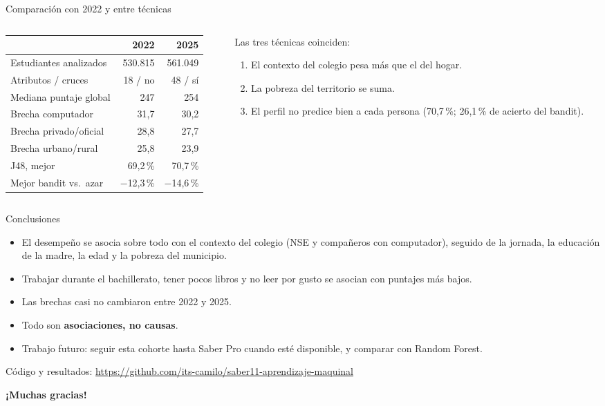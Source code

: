 \documentclass[aspectratio=169,11pt]{beamer}
\begin{document}
\begin{frame}{Comparación con 2022 y entre técnicas}
  \begin{columns}
    \begin{column}{0.55\textwidth}
      \small
      \begin{tabular}{lrr}
        \toprule
        & 2022 & 2025 \\
        \midrule
        Estudiantes analizados & 530.815 & 561.049 \\
        Atributos / cruces & 18 / no & 48 / sí \\
        Mediana puntaje global & 247 & 254 \\
        Brecha computador & 31,7 & 30,2 \\
        Brecha privado/oficial & 28,8 & 27,7 \\
        Brecha urbano/rural & 25,8 & 23,9 \\
        J48, mejor & 69,2\,\% & 70,7\,\% \\
        Mejor bandit vs.\ azar & $-$12,3\,\% & $-$14,6\,\% \\
        \bottomrule
      \end{tabular}
    \end{column}
    \begin{column}{0.45\textwidth}
      Las tres técnicas coinciden:
      \begin{enumerate}
        \item El contexto del colegio pesa más que el del hogar.
        \item La pobreza del territorio se suma.
        \item El perfil no predice bien a cada persona
        (70,7\,\%; 26,1\,\% de acierto del bandit).
      \end{enumerate}
    \end{column}
  \end{columns}
\end{frame}

\begin{frame}{Conclusiones}
  \begin{itemize}
    \item El desempeño se asocia sobre todo con el contexto del colegio
    (NSE y compañeros con computador), seguido de la jornada, la educación
    de la madre, la edad y la pobreza del municipio.
    \item Trabajar durante el bachillerato, tener pocos libros y no leer por
    gusto se asocian con puntajes más bajos.
    \item Las brechas casi no cambiaron entre 2022 y 2025.
    \item Todo son \textbf{asociaciones, no causas}.
    \item Trabajo futuro: seguir esta cohorte hasta Saber Pro cuando esté
    disponible, y comparar con Random Forest.
  \end{itemize}
  \vspace{0.4cm}
  \centering
  Código y resultados: \url{https://github.com/its-camilo/saber11-aprendizaje-maquinal}

  \vspace{0.2cm}
  \textbf{¡Muchas gracias!}
\end{frame}
\end{document}
